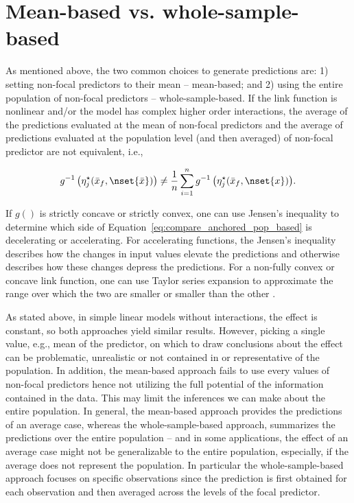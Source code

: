 \section{Mean-based vs. whole-sample-based}

As mentioned above, the two common choices to generate predictions are: 1) setting non-focal predictors to their mean -- mean-based; and 2) using the entire population of non-focal predictors -- whole-sample-based. If the link function is nonlinear and/or the model has complex higher order interactions, the average of the predictions evaluated at the mean of non-focal predictors and the average of predictions evaluated at the population level (and then averaged) of non-focal predictor are not equivalent, i.e.,

\begin{align}\label{eq:compare_anchored_pop_based}
g^{-1} \left(\eta_j^\star(\bar{x}_f, \nset{\bar{x}})\right) \neq \frac{1}{n} \sum_{i=1}^n{ g^{-1} \left(\eta_j^\star(\bar{x}_f, \nset{x})\right)}.
\end{align}

If $g()$ is strictly concave or strictly convex, one can use Jensen's inequality to determine which side of Equation~\ref{eq:compare_anchored_pop_based} is decelerating or accelerating. For accelerating functions, the Jensen’s inequality describes how the changes in input values elevate the predictions and otherwise describes how these changes depress the predictions. For a non-fully convex or concave link function, one can use Taylor series expansion to approximate the range over which the two are smaller or smaller than the other \citep{hanmer2013behind}. 


As stated above, in simple linear models without interactions, the effect is constant, so both approaches yield similar results. However, picking a single value, e.g., mean of the predictor, on which to draw conclusions about the effect can be problematic, unrealistic or not contained in or representative of the population. In addition, the mean-based approach fails to use every values of non-focal predictors hence not utilizing the full potential of the information contained in the data. This may limit the inferences we can make about the entire population. In general, the mean-based approach provides the predictions of an average case, whereas the whole-sample-based approach, summarizes the predictions over the entire population -- and in some applications, the effect of an average case might not be generalizable to the entire population, especially, if the average does not represent the population. In particular the whole-sample-based approach focuses on specific observations since the prediction is first obtained for each observation and then averaged across the levels of the focal predictor.

